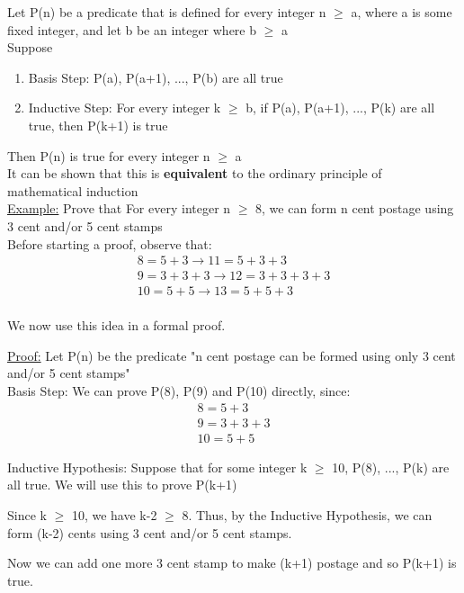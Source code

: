 \documentclass{article}
\begin{document}
Let P(n) be a predicate that is defined for every integer n $\geq$ a, where a is some fixed integer, and let b be an integer where b $\geq$ a \\

Suppose

\begin{enumerate}
\item Basis Step: P(a), P(a+1), ..., P(b) are all true
\item Inductive Step: For every integer k $\geq$ b, if P(a), P(a+1), ..., P(k) are all true, then P(k+1) is true
\end{enumerate}

Then P(n) is true for every integer n $\geq$ a \\

It can be shown that this is \textbf{equivalent}  to the ordinary principle of mathematical induction \\

\underline{Example:} Prove that
For every integer n $\geq$ 8, we can form n cent postage using 3 cent and/or 5 cent stamps \\

Before starting a proof, observe that:
\begin{align}
8 = 5 + 3 \rightarrow 11 = 5 + 3 + 3 \\
9 = 3 + 3 + 3 \rightarrow 12 = 3 + 3 + 3 + 3 \\
10 = 5 + 5 \rightarrow 13 = 5 + 5 + 3 \\
\end{align}

We now use this idea in a formal proof.

\underline{Proof:} Let P(n) be the predicate
"n cent postage can be formed using only 3 cent and/or 5 cent stamps" \\

Basis Step: We can prove P(8), P(9) and P(10) directly, since:
\begin{align}
8 = 5 + 3 \\
9 = 3 + 3 + 3 \\
10 = 5 + 5
\end{align}

Inductive Hypothesis: Suppose that for some integer k $\geq$ 10, P(8), ..., P(k) are all true. We will use this to prove P(k+1) 

Since k $\geq$ 10, we have k-2 $\geq$ 8. Thus, by the Inductive Hypothesis, we can form (k-2) cents using 3 cent and/or 5 cent stamps.

Now we can add one more 3 cent stamp to make (k+1) postage and so P(k+1) is true.
\end{document}
